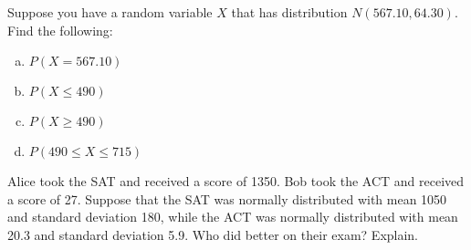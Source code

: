 \documentclass[11pt,letterpaper]{article}
\begin{document}

 Suppose you have a random variable $X$ that has distribution $N(567.10, 64.30)$. Find the following:
	\begin{enumerate}[(a)]
	\item $P(X= 567.10)$
	\item $P(X \leq 490)$
	\item $P(X \geq 490)$
	\item $P(490 \leq X \leq 715)$
	\end{enumerate}



\newpage



 Alice took the SAT and received a score of 1350. Bob took the ACT and received a score of 27. Suppose that the SAT was normally distributed with mean 1050 and standard deviation 180, while the ACT was normally distributed with mean 20.3 and standard deviation 5.9. Who did better on their exam? Explain.
\end{document}

